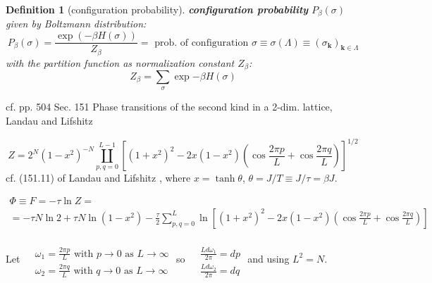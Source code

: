 \documentclass[10pt]{amsart}
\newtheorem{definition}{Definition}
\begin{document}
\begin{multicols*}{2}
\begin{definition}[configuration probability]
\textbf{configuration probability} $P_{\beta}(\sigma)$ given by Boltzmann distribution:  
\begin{equation}\label{Eq:Isingconfigprob}
 P_{\beta}(\sigma) = \frac{ \exp{ (-\beta H(\sigma))} }{ Z_{\beta} } = \text{ prob. of configuration } \sigma \equiv \sigma(\Lambda) \equiv (\sigma_{\mathbf{k}})_{\mathbf{k} \in \Lambda}
\end{equation} with the partition function as normalization constant $Z_{\beta}$: 
\begin{equation}\label{Eq:IsingPartitionFuncZ}
Z_{\beta} = \sum_{\sigma} \exp{ -\beta H(\sigma)}
\end{equation}
\end{definition}  



cf. pp. 504 Sec. 151 Phase transitions of the second kind in a 2-dim. lattice,  Landau and Lifshitz \cite{LaLi1980}


\begin{equation}\label{Eq:2dIsingZexact}
Z = 2^N(1-x^2)^{-N} \coprod_{p,q=0}^{L-1} \left[ (1+x^2)^2 - 2x(1-x^2) \left( \cos{ \frac{2\pi p}{L} } + \cos{ \frac{2\pi q }{L} } \right) \right]^{1/2} 
\end{equation}
cf. (151.11) of Landau and Lifshitz \cite{LaLi1980}, where $x= \tanh{\theta}$, $\theta = J/T \equiv J/\tau = \beta J$.  

\begin{equation}
\begin{gathered}
\Phi \equiv F = -\tau \ln{Z} = \\
= -\tau N \ln{2} + \tau N \ln{ (1-x^2)} - \frac{\tau}{2} \sum_{p,q=0}^L \ln{ \left[ (1+x^2)^2 - 2x(1-x^2) \left( \cos{ \frac{2\pi p}{L} } + \cos{ \frac{2\pi q }{L} } \right) \right] }
\end{gathered}
\end{equation}

Let $\begin{aligned}& \quad \\ 
& \omega_1 = \frac{2\pi p }{ L } \text{ with } p\to 0 \text{ as } L \to \infty \\ 
& \omega_2 = \frac{2\pi q }{ L } \text{ with } q\to 0 \text{ as } L \to \infty \end{aligned}$ so $\begin{aligned} & \quad \\ 
& \frac{ L d\omega_1 }{2\pi } = dp \\ 
& \frac{ L d\omega_2}{ 2\pi } = dq \end{aligned}$ and using $L^2 = N$.  



\end{multicols*}
\end{document}
